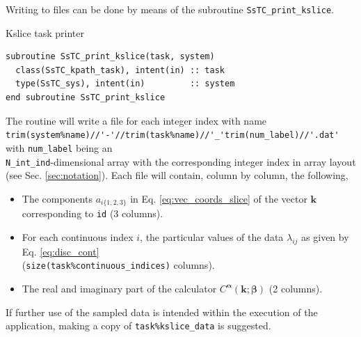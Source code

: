 \documentclass[10pt,a4paper]{article}
\begin{document}
Writing to files can be done by means of the subroutine \verb|SsTC_print_kslice|.
\begin{codebox}{Kslice task printer}
\begin{lstlisting}[caption={Interface of the kslice task printer.},captionpos=b]
subroutine SsTC_print_kslice(task, system)
  class(SsTC_kpath_task), intent(in) :: task
  type(SsTC_sys), intent(in)         :: system
end subroutine SsTC_print_kslice
\end{lstlisting}
\end{codebox}
The routine will write a file for each integer index with name \\ \verb|trim(system%name)//'-'//trim(task%name)//'_'trim(num_label)//'.dat'| with \verb|num_label| being an \\ \verb|N_int_ind|-dimensional array with the corresponding integer index in array layout (see Sec. \ref{sec:notation}). Each file will contain, column by column, the following,
\begin{tcolorbox}
\begin{itemize}
\item The components $a_{i\{1, 2, 3\}}$ in Eq. \eqref{eq:vec_coords_slice} of the vector $\bm{k}$ corresponding to \verb|id| (3 columns).
\item For each continuous index $i$, the particular values of the data $\lambda_{ij}$ as given by Eq. \eqref{eq:disc_cont} \\ (\verb|size(task%continuous_indices)| columns).
\item The real and imaginary part of the calculator $C^{\bm{\alpha}}(\bm{k}; \bm{\beta})$ (2 columns).
\end{itemize}
\end{tcolorbox}
If further use of the sampled data is intended within the execution of the application, making a copy of \verb|task%kslice_data| is suggested.
\end{document}
